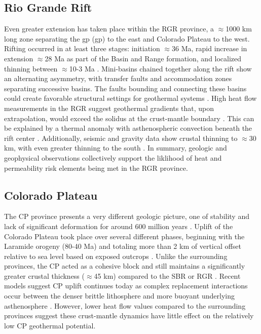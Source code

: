 \subsection{Rio Grande Rift}\label{ch2:rgr_province}
Even greater extension has taken place within the RGR province, a $\approx$1000 km long zone separating the \acrlong{gp} (\acrshort{gp}) to the east and Colorado Plateau to the west. Rifting occurred in at least three stages: initiation $\approx$36 Ma, rapid increase in extension $\approx$28 Ma as part of the Basin and Range formation, and localized thinning between $\approx$10-3 Ma \citep{bielicki_hydrogeolgic_2015,mack_geology_2008,seager_new_1984}. Mini-basins chained together along the rift show an alternating asymmetry, with transfer faults and accommodation zones separating successive basins. The faults bounding and connecting these basins could create favorable structural settings for geothermal systems \citep{faulds_favorable_2015}. High heat flow measurements in the RGR suggest geothermal gradients that, upon extrapolation, would exceed the solidus at the crust-mantle boundary \citep{olsen_rio_1987}. This can be explained by a thermal anomaly with asthenospheric convection beneath the rift center \citep{olsen_rio_1987}. Additionally, seismic and gravity data show crustal thinning to $\approx$30 km, with even greater thinning to the south \citep{keller_rio_1999}. In summary, geologic and geophysical observations collectively support the liklihood of heat and permeability risk elements being met in the RGR province. 

\subsection{Colorado Plateau}\label{ch2:cp_province}
The CP province presents a very different geologic picture, one of stability and lack of significant deformation for around 600 million years \citep{leighty_neogene_1997}. Uplift of the Colorado Plateau took place over several different phases, beginning with the Laramide orogeny (80-40 Ma) and totaling more than 2 km of vertical offset relative to sea level based on exposed outcrops \citep{moucha_deep_2009}. Unlike the surrounding provinces, the CP acted as a cohesive block and still maintains a significantly greater crustal thickness ($\approx$45 km) compared to the SBR or RGR \citep{wilson_imaging_2005}. Recent models suggest CP uplift continues today as complex replacement interactions occur between the denser brittle lithosphere and more buoyant underlying asthenosphere \citep{levander_continuing_2011}. However, lower heat flow values compared to the surrounding provinces \citep{thompson_regional_1979} suggest these crust-mantle dynamics have little effect on the relatively low CP geothermal potential.

